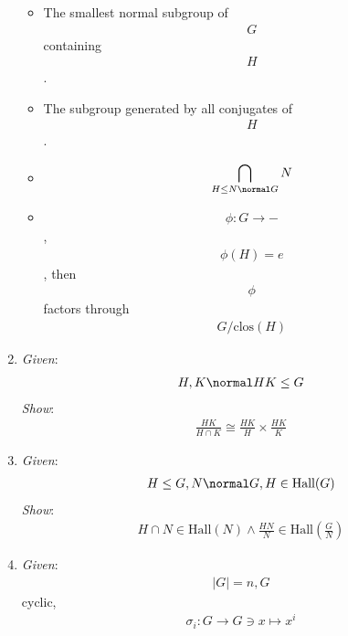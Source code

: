 \begin{enumerate}
  \begin{itemize}
  \tightlist
  \item
    The smallest normal subgroup of \begin{align*}
    G\end{align*}
     containing \begin{align*}
    H\end{align*}
    .
  \item
    The subgroup generated by all conjugates of \begin{align*}
    H\end{align*}
    .
  \item
    \begin{align*}
    \bigcap_{H \leq N \normal G} N\end{align*}
  \item
    \begin{align*}
    \phi: G \rightarrow -\end{align*}
    , \begin{align*}
    \phi(H) = e\end{align*}
    , then \begin{align*}
    \phi\end{align*}
     factors through \begin{align*}
    G/\text{clos}(H)\end{align*}
  \end{itemize}
\item
  \emph{Given}: \begin{align*}
  H, K \normal HK \leq G\end{align*}
   \emph{Show}: \begin{align*}
   \frac{HK}{H\cap K} \cong \frac{HK}{H}\times \frac{HK}{K}\end{align*}
\item
  \emph{Given}: \begin{align*}
  H\leq G, N \normal G, H \in \text{Hall}(G)\end{align*}
   \emph{Show}: \begin{align*}
  H\cap N \in \text{Hall}(N) \wedge \frac{HN}{N} \in \text{Hall}(\frac{G}{N})\end{align*}
\item
  \emph{Given}: \begin{align*}
  |G| = n, G\end{align*}
   cyclic, \begin{align*}
  \sigma_i: G \rightarrow G \ni x \mapsto x^i\end{align*}


\end{enumerate}
